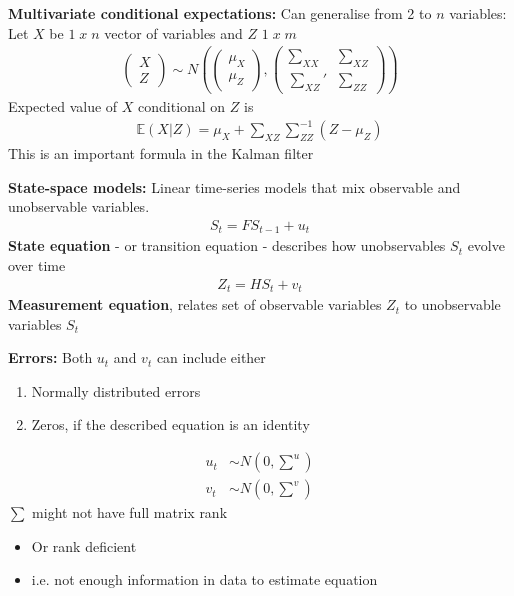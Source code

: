 \documentclass{beamer}
\begin{document}
\begin{frame}
  \textbf{Multivariate conditional expectations:} Can generalise from 2 to $n$ variables:
  Let $X$ be $1\; x\; n$ vector of variables and $Z$ $1\; x\; m$
  \begin{align}
    \begin{pmatrix}      X \\ Z    \end{pmatrix} \sim N \left( 
    \begin{pmatrix}      \mu_X \\ \mu_Z    \end{pmatrix},
    \begin{pmatrix}      \sum_{XX} & \sum_{XZ} \\ \sum_{XZ}' & \sum_{ZZ}    \end{pmatrix}
    \right)
  \end{align}
  \medskip 
  Expected value of $X$ conditional on $Z$ is 
  \begin{align}
    \mathbb{E}(X|Z) = \mu_X + \scriptstyle \sum_{XZ}\sum^{-1}_{ZZ} \textstyle(Z-\mu_Z)
  \end{align}
  \medskip
  This is an important formula in the Kalman filter
\end{frame}

\begin{frame}
  \textbf{State-space models:} Linear time-series models that mix observable and unobservable variables.
  \begin{align}
    S_t=FS_{t-1} + u_t
  \end{align}
  \textbf{State equation} - or transition equation - describes how unobservables $S_t$ evolve over time
  \begin{align}
    Z_t= HS_t +v_t
  \end{align}
  \textbf{Measurement equation}, relates set of observable variables $Z_t$ to unobservable variables $S_t$  
\end{frame}

\begin{frame}
  \textbf{Errors:} Both $u_t$ and $v_t$ can include either 
  \begin{enumerate}
    \item Normally distributed errors
    \item Zeros, if the described equation is an identity
  \end{enumerate}
  \begin{align}
    u_t &\sim N(0,\scriptstyle \sum^u) \\
    v_t &\sim N(0,\scriptstyle \sum^v)
  \end{align}
  \medskip
  $\sum$ might not have full matrix rank
  \begin{itemize}
    \item Or rank deficient
    \item i.e. not enough information in data to estimate equation
  \end{itemize}  
\end{frame}
\end{document}
